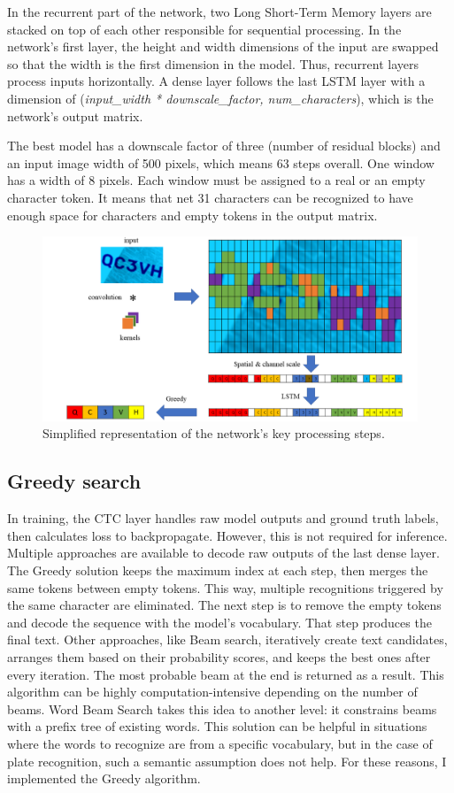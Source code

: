 In the recurrent part of the network, two Long Short-Term Memory\cite{LSTM} layers are stacked on top of each other responsible for sequential processing. In the network's first layer, the height and width dimensions of the input are swapped so that the width is the first dimension in the model. Thus, recurrent layers process inputs horizontally. A dense layer follows the last LSTM layer with a dimension of (\textit{input\_width * downscale\_factor, num\_characters}), which is the network's output matrix.

The best model has a downscale factor of three (number of residual blocks) and an input image width of 500 pixels, which means 63 steps overall. One window has a width of 8 pixels. Each window must be assigned to a real or an empty character token. It means that net 31 characters can be recognized to have enough space for characters and empty tokens in the output matrix.

\begin{figure}[htb]
 \centerline{\includegraphics[width=.85\columnwidth]{.//Figure/OCR/Slide5.PNG}}
 \caption{Simplified representation of the network's key processing steps.}
 \label{fig:simple}
\end{figure}

\subsection{Greedy search}

In training, the CTC layer handles raw model outputs and ground truth labels, then calculates loss to backpropagate. However, this is not required for inference. Multiple approaches are available to decode raw outputs of the last dense layer. The Greedy solution keeps the maximum index at each step, then merges the same tokens between empty tokens. This way, multiple recognitions triggered by the same character are eliminated. The next step is to remove the empty tokens and decode the sequence with the model's vocabulary. That step produces the final text. Other approaches, like Beam search, iteratively create text candidates, arranges them based on their probability scores, and keeps the best ones after every iteration. The most probable beam at the end is returned as a result. This algorithm can be highly computation-intensive depending on the number of beams. Word Beam Search\cite{WordBeamSearch} takes this idea to another level: it constrains beams with a prefix tree of existing words. This solution can be helpful in situations where the words to recognize are from a specific vocabulary, but in the case of plate recognition, such a semantic assumption does not help. For these reasons, I implemented the Greedy algorithm.


